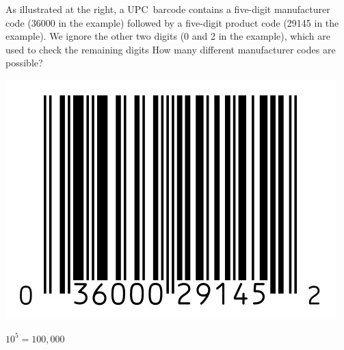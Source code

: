 \documentclass[addpoints,12pt]{exam}
\begin{document}
\begin{questions}

\begin{multicols}{2}
\question[10]
As illustrated at the right,
a UPC~barcode contains
a five-digit manufacturer code (36000 in the example)
followed by a five-digit product code
(29145 in the example).
We ignore the other two digits
(0 and 2 in the example), which are used to check the remaining digits
How many different
manufacturer codes are possible?
\break\\
\begin{center}\includegraphics[scale=.25]{Barcode}\end{center}
\end{multicols}
\begin{solution}$10^5=100,000$\end{solution}
\ifprintanswers\else\newpage\fi


\end{questions}
\end{document}
